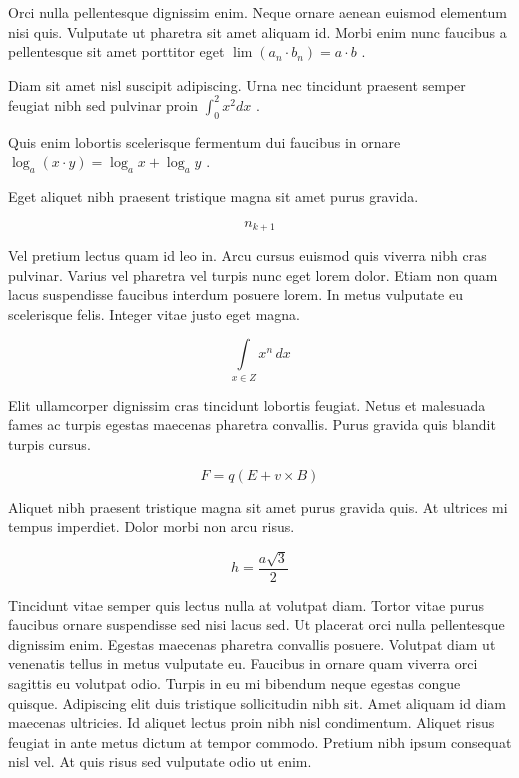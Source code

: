 \documentclass{article}
\begin{document}
	
    Orci nulla pellentesque dignissim enim. Neque ornare aenean euismod elementum nisi quis. Vulputate ut pharetra sit amet aliquam id. Morbi enim nunc faucibus a pellentesque sit amet porttitor eget  
    \begin{math}
    	\lim\left ( a_n\cdot b_n \right )=a\cdot b
    \end{math}
    .
    \newline
    
   Diam sit amet nisl suscipit adipiscing. Urna nec tincidunt praesent semper feugiat nibh sed pulvinar proin 
   $ \int_0^2x^2dx $
   .
   \newline
    
    Quis enim lobortis scelerisque fermentum dui faucibus in ornare 
    \( \log _{a}(x\cdot y)=\log _{a}x+\log _{a}y \)
    .
    \newline
    
    Eget aliquet nibh praesent tristique magna sit amet purus gravida.
    
    \[ n_{k+1}  \]
    
    Vel pretium lectus quam id leo in. Arcu cursus euismod quis viverra nibh cras pulvinar. Varius vel pharetra vel turpis nunc eget lorem dolor. Etiam non quam lacus suspendisse faucibus interdum posuere lorem. In metus vulputate eu scelerisque felis. Integer vitae justo eget magna.
    
    $$ \int\limits_{x\in Z}\! x^{n}\, dx $$
    
    Elit ullamcorper dignissim cras tincidunt lobortis feugiat. Netus et malesuada fames ac turpis egestas maecenas pharetra convallis. Purus gravida quis blandit turpis cursus. 
    
    \begin{displaymath}
    	F=q\left ( E+v \times B \right )
    \end{displaymath}
    
    Aliquet nibh praesent tristique magna sit amet purus gravida quis. At ultrices mi tempus imperdiet. Dolor morbi non arcu risus.
    
    \begin{equation}
    	h=\frac{a\sqrt{3}}{2}
    \end{equation}
    
    Tincidunt vitae semper quis lectus nulla at volutpat diam. Tortor vitae purus faucibus ornare suspendisse sed nisi lacus sed. Ut placerat orci nulla pellentesque dignissim enim. Egestas maecenas pharetra convallis posuere. Volutpat diam ut venenatis tellus in metus vulputate eu. Faucibus in ornare quam viverra orci sagittis eu volutpat odio. Turpis in eu mi bibendum neque egestas congue quisque. Adipiscing elit duis tristique sollicitudin nibh sit. Amet aliquam id diam maecenas ultricies. Id aliquet lectus proin nibh nisl condimentum. Aliquet risus feugiat in ante metus dictum at tempor commodo. Pretium nibh ipsum consequat nisl vel. At quis risus sed vulputate odio ut enim.
    
\end{document}
